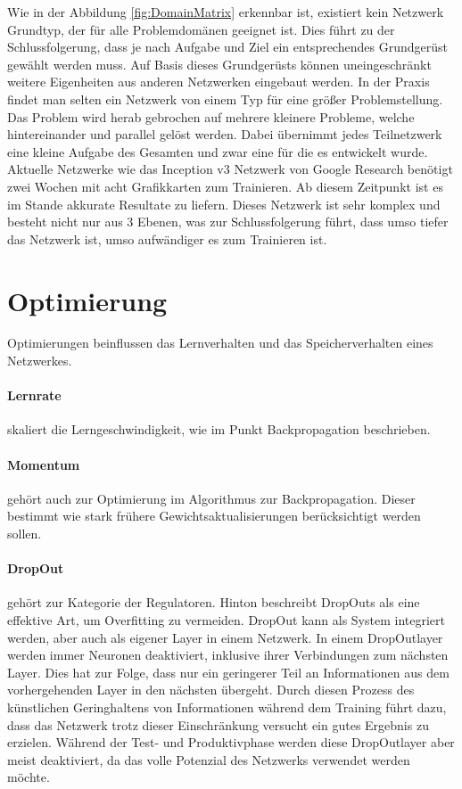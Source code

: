 Wie in der Abbildung \ref{fig:DomainMatrix} erkennbar ist, existiert kein Netzwerk Grundtyp, der für alle Problemdomänen geeignet ist.
Dies führt zu der Schlussfolgerung, dass je nach Aufgabe und Ziel ein entsprechendes Grundgerüst gewählt werden muss. 
Auf Basis dieses Grundgerüsts können uneingeschränkt weitere Eigenheiten aus anderen Netzwerken eingebaut werden.
In der Praxis findet man selten ein Netzwerk von einem Typ für eine größer Problemstellung. 
Das Problem wird herab gebrochen auf mehrere kleinere Probleme, welche hintereinander und parallel gelöst werden.
Dabei übernimmt jedes Teilnetzwerk eine kleine Aufgabe des Gesamten und zwar eine für die es entwickelt wurde. 
Aktuelle Netzwerke wie das Inception v3 Netzwerk von Google Research benötigt zwei Wochen mit acht Grafikkarten zum Trainieren. 
Ab diesem Zeitpunkt ist es im Stande akkurate Resultate zu liefern. 
Dieses Netzwerk ist sehr komplex und besteht nicht nur aus 3 Ebenen, was zur Schlussfolgerung führt, dass umso tiefer das Netzwerk ist, umso aufwändiger  es zum Trainieren ist.

\section{Optimierung}

Optimierungen beinflussen das Lernverhalten und das Speicherverhalten eines Netzwerkes.

\paragraph{Lernrate} skaliert die Lerngeschwindigkeit, wie im Punkt Backpropagation beschrieben.

\paragraph{Momentum} gehört auch zur Optimierung im Algorithmus zur Backpropagation.
Dieser bestimmt wie stark frühere Gewichtsaktualisierungen berücksichtigt werden sollen. 

\paragraph{DropOut} gehört zur Kategorie der Regulatoren. 
Hinton \cite{krizhevsky2012imagenet} beschreibt DropOuts als eine effektive Art, um Overfitting zu vermeiden.
DropOut kann als System integriert werden, aber auch als eigener Layer in einem Netzwerk.
In einem DropOutlayer werden immer Neuronen deaktiviert, inklusive ihrer Verbindungen zum nächsten Layer.
Dies hat zur Folge, dass nur ein geringerer Teil an Informationen aus dem vorhergehenden Layer in den nächsten übergeht. 
Durch diesen Prozess des künstlichen Geringhaltens von Informationen während dem Training führt dazu, dass das Netzwerk trotz dieser Einschränkung versucht ein gutes Ergebnis zu erzielen. 
Während der Test- und Produktivphase werden diese DropOutlayer aber meist deaktiviert, da das volle Potenzial des Netzwerks verwendet werden möchte.

